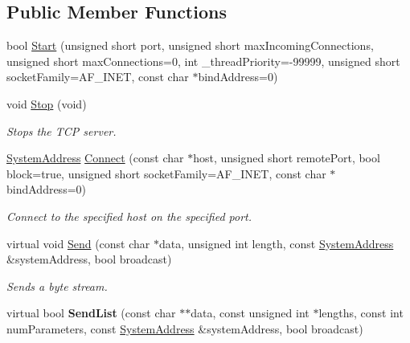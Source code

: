 \subsection*{Public Member Functions}
\begin{DoxyCompactItemize}
\item 
bool \hyperlink{class_rak_net_1_1_t_c_p_interface_a3d358d9beb479e55c3e2c848ec6fb0d7}{Start} (unsigned short port, unsigned short max\-Incoming\-Connections, unsigned short max\-Connections=0, int \-\_\-thread\-Priority=-\/99999, unsigned short socket\-Family=A\-F\-\_\-\-I\-N\-E\-T, const char $\ast$bind\-Address=0)
\item 
\hypertarget{class_rak_net_1_1_t_c_p_interface_a9d354a02dc5c4b6abcfeb85eaaff3ed9}{void \hyperlink{class_rak_net_1_1_t_c_p_interface_a9d354a02dc5c4b6abcfeb85eaaff3ed9}{Stop} (void)}\label{class_rak_net_1_1_t_c_p_interface_a9d354a02dc5c4b6abcfeb85eaaff3ed9}

\begin{DoxyCompactList}\small\item\em Stops the T\-C\-P server. \end{DoxyCompactList}\item 
\hypertarget{class_rak_net_1_1_t_c_p_interface_a5268f2c413ef70bca573134ea0b8875c}{\hyperlink{struct_rak_net_1_1_system_address}{System\-Address} \hyperlink{class_rak_net_1_1_t_c_p_interface_a5268f2c413ef70bca573134ea0b8875c}{Connect} (const char $\ast$host, unsigned short remote\-Port, bool block=true, unsigned short socket\-Family=A\-F\-\_\-\-I\-N\-E\-T, const char $\ast$bind\-Address=0)}\label{class_rak_net_1_1_t_c_p_interface_a5268f2c413ef70bca573134ea0b8875c}

\begin{DoxyCompactList}\small\item\em Connect to the specified host on the specified port. \end{DoxyCompactList}\item 
\hypertarget{class_rak_net_1_1_t_c_p_interface_a1d9cf3818fddd5d9b9fd36fdb424799c}{virtual void \hyperlink{class_rak_net_1_1_t_c_p_interface_a1d9cf3818fddd5d9b9fd36fdb424799c}{Send} (const char $\ast$data, unsigned int length, const \hyperlink{struct_rak_net_1_1_system_address}{System\-Address} \&system\-Address, bool broadcast)}\label{class_rak_net_1_1_t_c_p_interface_a1d9cf3818fddd5d9b9fd36fdb424799c}

\begin{DoxyCompactList}\small\item\em Sends a byte stream. \end{DoxyCompactList}\item 
\hypertarget{class_rak_net_1_1_t_c_p_interface_a594ac189b999f731fa52ef8e6e5c1971}{virtual bool {\bfseries Send\-List} (const char $\ast$$\ast$data, const unsigned int $\ast$lengths, const int num\-Parameters, const \hyperlink{struct_rak_net_1_1_system_address}{System\-Address} \&system\-Address, bool broadcast)}\label{class_rak_net_1_1_t_c_p_interface_a594ac189b999f731fa52ef8e6e5c1971}


\end{DoxyCompactItemize}
